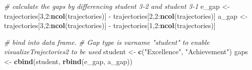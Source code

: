 \documentclass[english,floatsintext,jou]{apa6}
\newenvironment{Shaded}{\begin{snugshade}}{\end{snugshade}}
\newcommand{\KeywordTok}[1]{\textcolor[rgb]{0.13,0.29,0.53}{\textbf{{#1}}}}
\newcommand{\DecValTok}[1]{\textcolor[rgb]{0.00,0.00,0.81}{{#1}}}
\newcommand{\StringTok}[1]{\textcolor[rgb]{0.31,0.60,0.02}{{#1}}}
\newcommand{\CommentTok}[1]{\textcolor[rgb]{0.56,0.35,0.01}{\textit{{#1}}}}
\newcommand{\NormalTok}[1]{{#1}}
\theoremstyle{definition}
\theoremstyle{definition}
\theoremstyle{definition}
\theoremstyle{remark}
\begin{document}
\begin{appendix}
\begin{Shaded}
\begin{Highlighting}[]
\CommentTok{# calculate the gaps by differencing student 3-2 and student 3-1}
\NormalTok{e_gap <-}\StringTok{ }\NormalTok{trajectories[}\DecValTok{3}\NormalTok{,}\DecValTok{2}\NormalTok{:}\KeywordTok{ncol}\NormalTok{(trajectories)] -}\StringTok{ }\NormalTok{trajectories[}\DecValTok{2}\NormalTok{,}\DecValTok{2}\NormalTok{:}\KeywordTok{ncol}\NormalTok{(trajectories)]}
\NormalTok{a_gap <-}\StringTok{ }\NormalTok{trajectories[}\DecValTok{3}\NormalTok{,}\DecValTok{2}\NormalTok{:}\KeywordTok{ncol}\NormalTok{(trajectories)] -}\StringTok{ }\NormalTok{trajectories[}\DecValTok{1}\NormalTok{,}\DecValTok{2}\NormalTok{:}\KeywordTok{ncol}\NormalTok{(trajectories)]}

\CommentTok{# bind into data frame. }
\CommentTok{# Gap type is varname "student" to enable visualizeTrajectories2 to be used}
\NormalTok{student <-}\StringTok{ }\KeywordTok{c}\NormalTok{(}\StringTok{"Excellence"}\NormalTok{, }\StringTok{"Achievement"}\NormalTok{)}
\NormalTok{gaps <-}\StringTok{ }\KeywordTok{cbind}\NormalTok{(student, }\KeywordTok{rbind}\NormalTok{(e_gap, a_gap))}


\end{Highlighting}
\end{Shaded}
\end{appendix}
\end{document}
